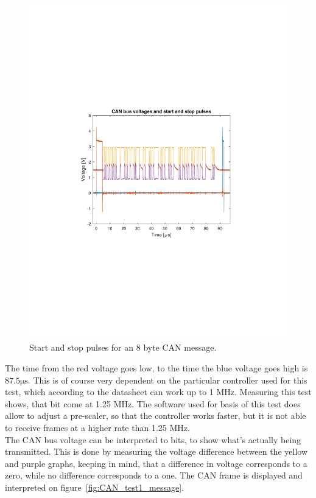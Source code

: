 \begin{figure}[h]
	\centering
	\includegraphics[width = \linewidth]{graphics/CAN_test1_raw}
	\caption{Start and stop pulses for an 8 byte CAN message. }
	\label{fig:CAN_test1_raw}
\end{figure}

The time from the red voltage goes low, to the time the blue voltage goes high is $87.5 \si{\micro\second}$.
This is of course very dependent on the particular controller used for this test, which according to the datasheet can work up to 1 MHz.
Measuring this test shows, that bit come at 1.25 MHz.
The software used for basis of this test does allow to adjust a pre-scaler, so that the controller works faster, but it is not able to receive frames at a higher rate than 1.25 MHz.\\

The CAN bus voltage can be interpreted to bits, to show what's actually being transmitted.
This is done by measuring the voltage difference between the yellow and purple graphs, keeping in mind, that a difference in voltage corresponds to a zero, while no difference corresponds to a one.
The CAN frame is displayed and interpreted on figure~\ref{fig:CAN_test1_message}.\\

